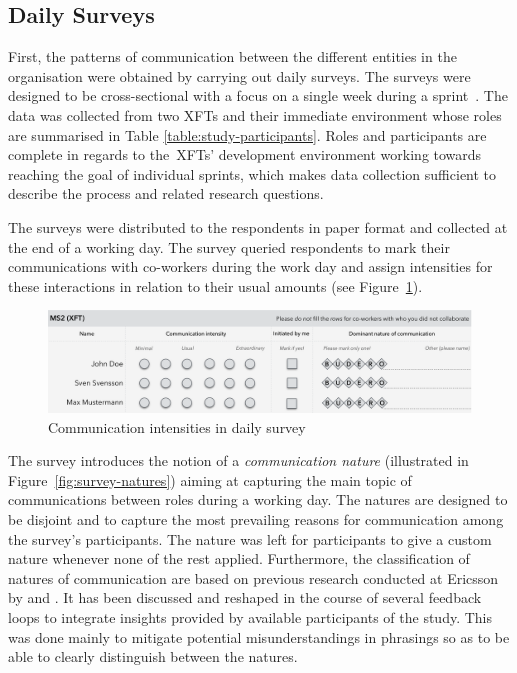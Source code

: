 \subsection{Daily Surveys}

First, the patterns of communication between the different entities in the organisation were obtained by carrying out daily surveys. The surveys were designed to be cross-sectional with a focus on a single week during a sprint~\citep{pinsonneault1993}. The data was collected from two \acp{XFT} and their immediate environment whose roles are summarised in Table \ref{table:study-participants}. Roles and participants are complete in regards to the~\acp{XFT}' development environment working towards reaching the goal of individual sprints, which makes data collection sufficient to describe the process and related research questions.

The surveys were distributed to the respondents in paper format and collected at the end of a working day.  
The survey queried respondents to mark their communications with co-workers during the work day and assign intensities for these interactions in relation to their usual amounts (see Figure~\ref{fig:survey-intenity}).  

\begin{figure}[h!]
  \centering
  \includegraphics[width=1.0\textwidth]{figures/fake-partial-intensity.png}
  \caption{Communication intensities in daily survey}
  \label{fig:survey-intenity}
\end{figure}

The survey introduces the notion of a \emph{communication nature} (illustrated in Figure~\ref{fig:survey-natures}) aiming at capturing the main topic of communications between roles during a working day. The natures are designed to be disjoint and to capture the most prevailing reasons for communication among the survey's participants. The nature  was left for participants to give a custom nature whenever none of the rest applied.
Furthermore, the classification of natures of communication are based on previous research conducted at Ericsson by \citet{nelson2013technicaldependencies} and \citet{boerjesson2013}. It has been discussed and reshaped in the course of several feedback loops to integrate insights provided by available participants of the study. This was done mainly to mitigate potential misunderstandings in phrasings so as to be able to clearly distinguish between the natures.

